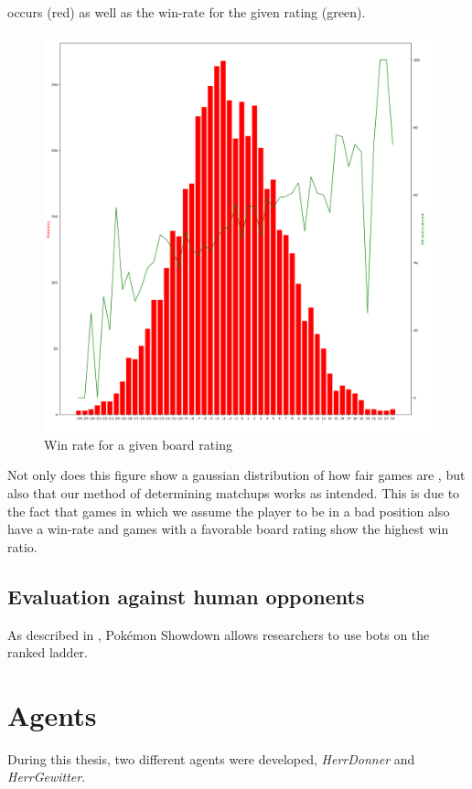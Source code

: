 occurs (red) as well as the win-rate for the given rating (green).
\begin{figure}[h]
	\centering
	\includegraphics[width=\textwidth]{images/boardrating.png}
	\caption{Win rate for a given board rating}
	\label{fig:wr-board-rating}
\end{figure}
Not only does this figure show a gaussian distribution of how fair games are ,
but also that our method of determining matchups works as intended. This is due to the fact that games 
in which we assume the player to be in a bad position also have a win-rate and games with a favorable
board rating show the highest win ratio.

\subsection{Evaluation against human opponents}
As described in , Pokémon Showdown allows researchers to use bots on the
ranked ladder. 

\section{Agents}
During this thesis, two different agents were developed, \textit{HerrDonner} and \textit{HerrGewitter}.

